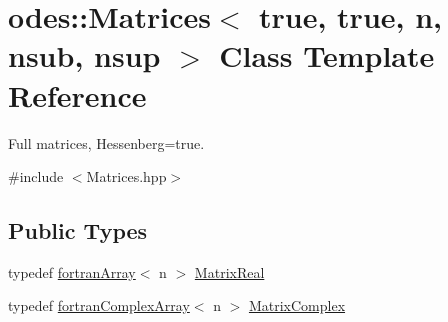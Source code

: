 \hypertarget{classodes_1_1Matrices_3_01true_00_01true_00_01n_00_01nsub_00_01nsup_01_4}{\section{odes\-:\-:Matrices$<$ true, true, n, nsub, nsup $>$ Class Template Reference}
\label{classodes_1_1Matrices_3_01true_00_01true_00_01n_00_01nsub_00_01nsup_01_4}
}


Full matrices, Hessenberg=true.  




{\ttfamily \#include $<$Matrices.\-hpp$>$}

\subsection*{Public Types}
\begin{DoxyCompactItemize}
\item 
typedef \hyperlink{classodes_1_1fortranArray}{fortran\-Array}$<$ n $>$ \hyperlink{classodes_1_1Matrices_3_01true_00_01true_00_01n_00_01nsub_00_01nsup_01_4_a9c13d85a737f0806d9cfff89d3d59c52}{Matrix\-Real}
\item 
typedef \hyperlink{classodes_1_1fortranComplexArray}{fortran\-Complex\-Array}$<$ n $>$ \hyperlink{classodes_1_1Matrices_3_01true_00_01true_00_01n_00_01nsub_00_01nsup_01_4_a2325063092d57345f62b8a0d38c0632b}{Matrix\-Complex}
\end{DoxyCompactItemize}
